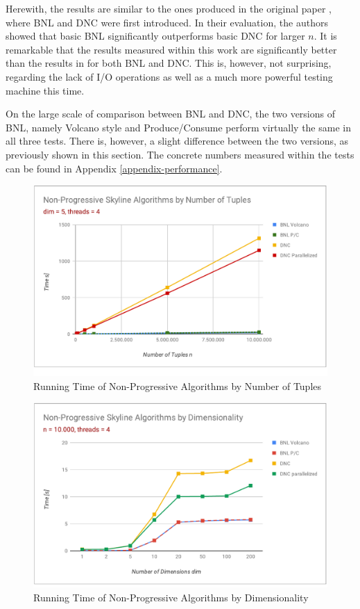 Herewith, the results are similar to the ones produced in the original paper \cite{kossmann}, where BNL and DNC were first introduced. In their evaluation, the authors showed that basic BNL significantly outperforms basic DNC for larger $n$. It is remarkable that the results measured within this work are significantly better than the results in \cite{kossmann} for both BNL and DNC. This is, however, not surprising, regarding the lack of I/O operations as well as a much more powerful testing machine this time. 

On the large scale of comparison between BNL and DNC, the two versions of BNL, namely Volcano style and Produce/Consume perform virtually the same in all three tests. There is, however, a slight difference between the two versions, as previously shown in this section. The concrete numbers measured within the tests can be found in Appendix \ref{appendix-performance}. 

\begin{figure}[h]
	\centering
	\includegraphics[width=1\linewidth]{figures/non-progressive-n}
	\caption{Running Time of Non-Progressive Algorithms by Number of Tuples}
	\label{fig:non-progressive-n}
\end{figure}

\begin{figure}[H]
	\centering
	\includegraphics[width=1\linewidth]{figures/non-progressive-dim}
	\caption{Running Time of Non-Progressive Algorithms by Dimensionality}
	\label{fig:non-progressive-dim}
\end{figure}

